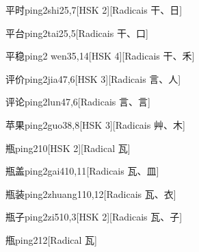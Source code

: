 \begin{entry}{平时}{ping2shi2}{5,7}[HSK 2][Radicais ⼲、⽇]
\end{entry}

\begin{entry}{平台}{ping2tai2}{5,5}[Radicais ⼲、⼝]
\end{entry}

\begin{entry}{平稳}{ping2 wen3}{5,14}[HSK 4][Radicais ⼲、⽲]
\end{entry}

\begin{entry}{评价}{ping2jia4}{7,6}[HSK 3][Radicais ⾔、⼈]
\end{entry}

\begin{entry}{评论}{ping2lun4}{7,6}[Radicais ⾔、⾔]
\end{entry}

\begin{entry}{苹果}{ping2guo3}{8,8}[HSK 3][Radicais ⾋、⽊]
\end{entry}

\begin{entry}{瓶}{ping2}{10}[HSK 2][Radical ⽡]
\end{entry}

\begin{entry}{瓶盖}{ping2gai4}{10,11}[Radicais ⽡、⽫]
\end{entry}

\begin{entry}{瓶装}{ping2zhuang1}{10,12}[Radicais ⽡、⾐]
\end{entry}

\begin{entry}{瓶子}{ping2zi5}{10,3}[HSK 2][Radicais ⽡、⼦]
\end{entry}

\begin{entry}{甁}{ping2}{12}[Radical ⽡]
\end{entry}

